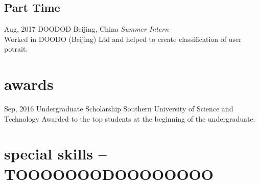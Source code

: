\documentclass[]{friggeri-cv-a4}
\begin{document}

\subsection{Part Time}

\begin{entrylist}

\entry
{Aug, 2017}
{DOODOD}
{Beijing, China}
{\emph{Summer Intern} \\
Worked in DOODO (Beijing) Ltd and helped to create classification of user potrait.}




\end{entrylist}


\section{awards}

\begin{entrylist}


\entry
{Sep, 2016}
{Undergraduate Scholarship}
{Southern University of Science and Technology}
{Awarded to the top students at the beginning of the undergraduate.}


\end{entrylist}


\section{special skills -- TOOOOOOODOOOOOOOO}
\end{document}
